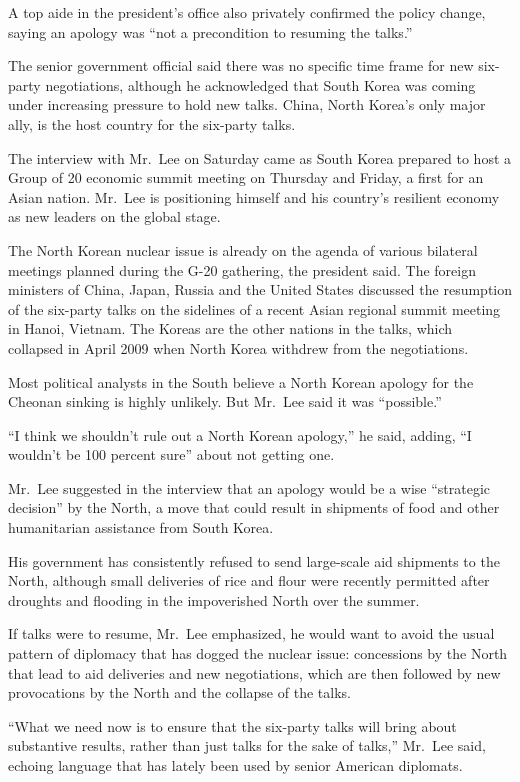 ﻿\documentclass[12pt]{article}
\begin{document}
A top aide in the president's office also privately confirmed the policy change, saying an apology
was ``not a precondition to resuming the talks.''

The senior government official said there was no specific time frame for new six-party negotiations,
although he acknowledged that South Korea was coming under increasing pressure to hold new talks.
China, North Korea's only major ally, is the host country for the six-party talks.

The interview with Mr.~Lee on Saturday came as South Korea prepared to host a Group of 20 economic
summit meeting on Thursday and Friday, a first for an Asian nation. Mr.~Lee is positioning himself
and his country's resilient economy as new leaders on the global stage.

The North Korean nuclear issue is already on the agenda of various bilateral meetings planned during
the G-20 gathering, the president said. The foreign ministers of China, Japan, Russia and the United
States discussed the resumption of the six-party talks on the sidelines of a recent Asian regional
summit meeting in Hanoi, Vietnam. The Koreas are the other nations in the talks, which collapsed in
April 2009 when North Korea withdrew from the negotiations.

Most political analysts in the South believe a North Korean apology for the Cheonan sinking is
highly unlikely. But Mr.~Lee said it was ``possible.''

``I think we shouldn't rule out a North Korean apology,'' he said, adding, ``I wouldn't be 100
percent sure'' about not getting one.

Mr.~Lee suggested in the interview that an apology would be a wise ``strategic decision'' by the
North, a move that could result in shipments of food and other humanitarian assistance from South
Korea.

His government has consistently refused to send large-scale aid shipments to the North, although
small deliveries of rice and flour were recently permitted after droughts and flooding in the
impoverished North over the summer.

If talks were to resume, Mr.~Lee emphasized, he would want to avoid the usual pattern of diplomacy
that has dogged the nuclear issue: concessions by the North that lead to aid deliveries and new
negotiations, which are then followed by new provocations by the North and the collapse of the
talks.

``What we need now is to ensure that the six-party talks will bring about substantive results,
rather than just talks for the sake of talks,'' Mr.~Lee said, echoing language that has lately been
used by senior American diplomats.
\end{document}
